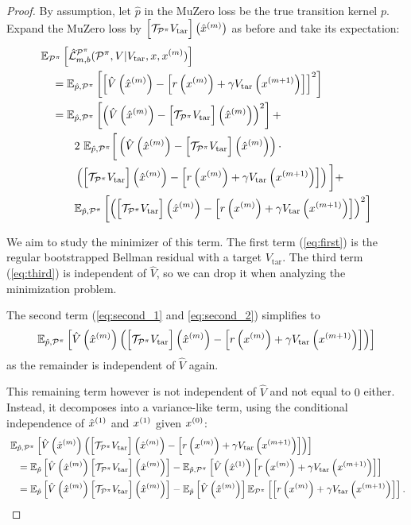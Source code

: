 \begin{proof}

By assumption, let $\hat{p}$ in the MuZero loss be the true transition kernel $p$. Expand the MuZero loss by $\target{m}$ as before and take its expectation:
\begin{align}
    &\EEX{\P^\pi}{\hat{\mathcal{L}}^{\P^\pi}_{m,b}(\P^\pi, V| V_{\mathrm{tar}}, x, x^{(m)})}\\ 
    &\quad = \EEX{\hat{p},\P^\pi}{\squareb{ \hat{V}\roundb{\mx{m}} - \TrV{m}}^2}\\
    &\quad = \EEX{\hat{p},\P^\pi}{ \roundb{\hat{V}\roundb{\mx{m}} - \target{m}}^2}  +\label{eq:first}\\
    &\quad \quad \quad 2~\mathbb{E}_{\hat{p},\P^\pi}\bigg[\roundb{\hat{V}\roundb{\mx{m}} - \target{m}} \cdot \label{eq:second_1}\\
    &\quad \quad \quad \roundb{\target{m} - \TrV{m}}\bigg] + \label{eq:second_2}\\
    &\quad \quad \quad \EEX{\hat{p},\P^\pi}{\roundb{\target{m} - \TrV{m}}^2}\label{eq:third}
\end{align}

We aim to study the minimizer of this term.
The first term (\autoref{eq:first}) is the regular bootstrapped Bellman residual with a target $V_\mathrm{tar}$.
The third term (\autoref{eq:third}) is independent of $\hat{V}$, so we can drop it when analyzing the minimization problem.

The second term (\autoref{eq:second_1} and \autoref{eq:second_2}) simplifies to
\begin{align}
    \EEX{\hat{p},\P^\pi}{\hat{V}\roundb{\mx{m}}\roundb{\target{m} - \TrV{m}}}
\end{align}
as the remainder is independent of $\hat{V}$ again.

This remaining term however is not independent of $\hat{V}$ and not equal to $0$ either.
Instead, it decomposes into a variance-like term, using the conditional independence of $\mx{1}$ and $\px{1}$ given $\px{0}$:
\begin{align}
    &~\EEX{\hat{p},\P^\pi}{ \hat{V}\roundb{\mx{m}}\roundb{\target{m} - \TrV{m}}}\\
    &\quad =\EEX{\hat{p}}{ \hat{V}\roundb{\mx{m}}\target{m}} - \EEX{\hat{p},\P^\pi}{\hat{V}\roundb{\mx{1}}\TrV{m}}\\
    &\quad =\EEX{\hat{p}}{ \hat{V}\roundb{\mx{m}}\target{m}} - \EEX{\hat{p}}{\hat{V}\roundb{\mx{m}}} \EEX{\P^\pi}{\TrV{m}}.
\end{align}


\end{proof}
